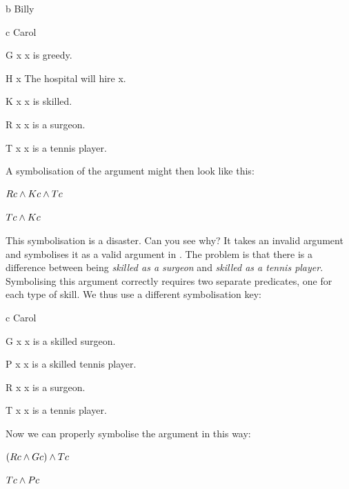 \documentclass[PHIL101-Textbook.tex]{subfiles}
\begin{document}
\begin{ekey}
\item[b] Billy
\item[c] Carol
\item[\atom G x ] x is greedy.
\item[\atom H x ] The hospital will hire x.
\item[\atom K x ] x is skilled.
\item[\atom R x ] x is a surgeon.
\item[\atom T x] x is a tennis player. 
\end{ekey}

\noindent A symbolisation of the argument might then look like this: 

\begin{earg}
\item[] $\mathord{R}{c}  \land \mathord{K}{c}  \land \mathord{T}{c} $
\item[\therefore] $\mathord{T}{c}  \land \mathord{K}{c} $
\end{earg}
\noindent This symbolisation is a disaster. Can you see why? It takes an invalid argument and symbolises it as a valid argument in \pl. The problem is that there is a difference between being \emph{skilled as a surgeon} and \emph{skilled as a tennis player}. Symbolising this argument correctly requires two separate predicates, one for each type of skill. We thus use a different symbolisation key:  

\begin{ekey}
\item[c] Carol
\item[\atom G x ] x is a skilled surgeon.
\item[\atom P x ] x is a skilled tennis player.
\item[\atom R x ] x is a surgeon.
\item[\atom T x] x is a tennis player. 
\end{ekey}

\noindent Now we can properly symbolise the argument in this way:
\begin{earg}
\label{surgeon3correct}
\item[] $(\mathord{R}{c}  \land \mathord{G}{c} ) \land \mathord{T}{c} $
\item[\therefore] $\mathord{T}{c}  \land \mathord{P}{c} $
\end{earg}
\end{document}
